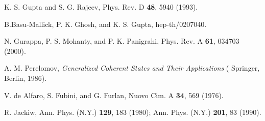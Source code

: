 \documentclass[a4paper,preprint,aps]{revtex4}
\def\Journal#1#2#3#4{{#1}{\bf #2},#3 (#4)}
\def\prd{{ Phys. Rev.} D}
\def\pra{{ Phys. Rev.} A}
\def\nuov{{ Nuovo Cim.} A}
\def\ann{{ Ann. Phys. (N.Y.)}}
\begin{document}
\begin{thebibliography}{99}
K. S. Gupta and S. G. Rajeev, \Journal{\prd}{ 48}{ 5940}{1993}.
 
B.Basu-Mallick, P. K. Ghosh, and K. S. Gupta, hep-th/0207040.

N. Gurappa, P. S. Mohanty, and P. K. Panigrahi,
\Journal{\pra}{ 61}{ 034703}{2000}.

A. M. Perelomov, {\em Generalized Coherent States and Their Applications} (
Springer, Berlin, 1986).

V. de Alfaro, S. Fubini, and G. Furlan, \Journal{\nuov}{ 34}{ 569}{1976}.

R. Jackiw, \Journal{\ann}{ 129}{ 183}{1980}; \Journal{\ann}{ 201}{ 83}{1990}.
\end{thebibliography}
\end{document}
